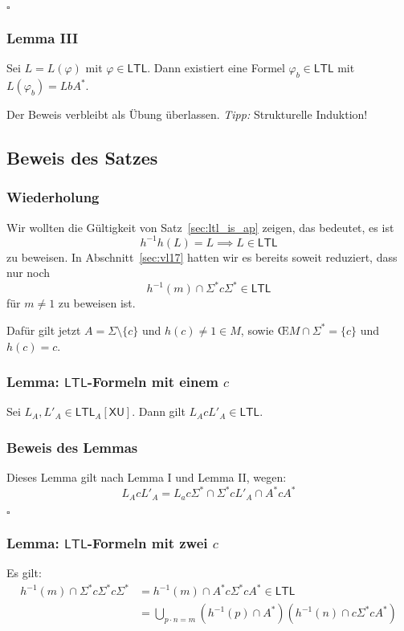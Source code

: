 \documentclass[12pt, german]{article}
\newcommand{\sigstern}{\Sigma^\ast}
\newcommand{\inv}{^{-1}}
\newcommand{\aast}{A^{\ast}}
\newcommand{\sast}{\Sigma^{\ast}}
\newcommand{\ltl}{\mathsf{LTL}}
\newcommand{\sX}{\mathsf{X}}
\newcommand{\sU}{\mathsf{U}}
\newcommand{\oei}{\OE\hspace{2pt}}
\newcommand{\bewiesen}{
	
	\begin{flushright}
		$\square$  \\
\end{flushright}}
\begin{document}
\bewiesen

\subsubsection{Lemma III}
	Sei $L = L(\varphi)$ mit $\varphi \in \ltl$. Dann existiert eine Formel $\varphi_b \in \ltl$ mit $L(\varphi_b) = Lb\aast$.\newline

	Der Beweis verbleibt als Übung überlassen. \textit{Tipp: } Strukturelle Induktion!

\subsection{Beweis des Satzes}
\subsubsection{Wiederholung}
	Wir wollten die Gültigkeit von Satz~\ref{sec:ltl_is_ap} zeigen, das bedeutet, es ist $$h\inv h(L) = L \implies L \in \ltl$$ zu beweisen. 
	In Abschnitt~\ref{sec:vl17} hatten wir es bereits soweit reduziert, dass nur noch  $$h\inv(m) \cap \sigstern c \sigstern \in \ltl$$ für $m \neq 1$ zu beweisen ist.\newline
	
	Dafür gilt jetzt $A = \Sigma \setminus \{c\}$ und $h(c) \neq 1 \in M$, sowie \oei $M \cap \sast = \{c\}$ und $h(c)=c$.


\subsubsection{Lemma: $\ltl$-Formeln mit einem $c$}
	Sei $L_A, L'_A \in \ltl_A[\sX\sU]$. Dann gilt $L_A c L'_A \in \ltl$.

\subsubsection{Beweis des Lemmas}
	Dieses Lemma gilt nach Lemma I und Lemma II, wegen: $$L_A c L'_A = L_a c \sigstern \cap \sigstern c L'_A \cap \aast c \aast$$
	\bewiesen

\subsubsection{Lemma: $\ltl$-Formeln mit zwei $c$}
	Es gilt: 
	\begin{align*}
	h\inv(m) \cap \sigstern c \sigstern c \sigstern &= h\inv(m) \cap \aast c \sigstern c \aast \in \ltl \\
	&= \bigcup_{p\cdot n = m}(h\inv(p) \cap \aast)(h\inv(n) \cap c \sigstern c \aast)
	\end{align*}
\end{document}
